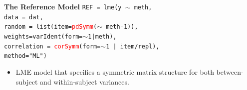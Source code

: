 \documentclass[compress]{beamer}        %
\makeatletter
\newcommand{\tcb}{\textcolor{beamer@blendedblue}}
\newcommand{\tcr}{\textcolor{red}}
\makeatother
\begin{document}
\begin{frame}[fragile]{\bf \tcb{The Reference Model}}
\texttt{REF = lme(y $\sim$ meth,\\
   \hspace{0.6cm} data = dat,\\
   \hspace{0.6cm} random = list(item=\tcr{pdSymm}($\sim$ meth-1)), \\
   \hspace{0.6cm} weights=varIdent(form=$\sim$1|meth),\\
   \hspace{0.6cm} correlation = \tcr{corSymm}(form=$\sim$1 | item/repl),\\
   \hspace{0.6cm} method="ML")}\\
\begin{itemize}
\item LME model that specifies a symmetric matrix structure for both between-subject and within-subject variances.
\end{itemize}

\end{frame}
\end{document}
